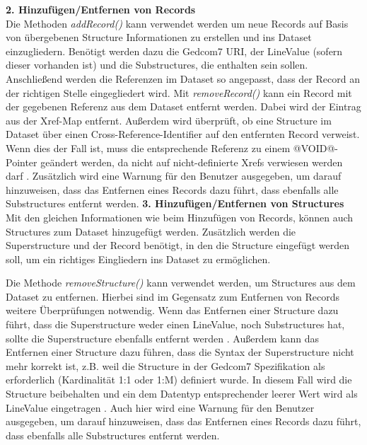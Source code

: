 \vspace{1em}
\textbf{2. Hinzufügen/Entfernen von Records} \vspace{0.5em} \\
Die Methoden \textit{addRecord()} kann verwendet werden um neue Records auf Basis von übergebenen Structure Informationen zu erstellen und ins Dataset einzugliedern. Benötigt werden dazu die Gedcom7 URI, der LineValue (sofern dieser vorhanden ist) und die Substructures, die enthalten sein sollen. Anschließend werden die Referenzen im Dataset so angepasst, dass der Record an der richtigen Stelle eingegliedert wird. Mit \textit{removeRecord()} kann ein Record mit der gegebenen Referenz aus dem Dataset entfernt werden. Dabei wird der Eintrag aus der Xref-Map entfernt. Außerdem wird überprüft, ob eine Structure im Dataset über einen Cross-Reference-Identifier auf den entfernten Record verweist. Wenn dies der Fall ist, muss die entsprechende Referenz zu einem @VOID@-Pointer geändert werden, da nicht auf nicht-definierte Xrefs verwiesen werden darf \cite{GEDCOM}. Zusätzlich wird eine Warnung für den Benutzer ausgegeben, um darauf hinzuweisen, dass das Entfernen eines Records dazu führt, dass ebenfalls alle Substructures entfernt werden. 
\newpage
\textbf{3. Hinzufügen/Entfernen von Structures} \vspace{0.5em} \\
Mit den gleichen Informationen wie beim Hinzufügen von Records, können auch Structures zum Dataset hinzugefügt werden. Zusätzlich werden die Superstructure und der Record benötigt, in den die Structure eingefügt werden soll, um ein richtiges Eingliedern ins Dataset zu ermöglichen. 


Die Methode \textit{removeStructure()} kann verwendet werden, um Structures aus dem Dataset zu entfernen. Hierbei sind im Gegensatz zum Entfernen von Records weitere Überprüfungen notwendig. Wenn das Entfernen einer Structure dazu führt, dass die Superstructure weder einen LineValue, noch Substructures hat, sollte die Superstructure ebenfalls entfernt werden \cite{GEDCOM}. Außerdem kann das Entfernen einer Structure dazu führen, dass die Syntax der Superstructure nicht mehr korrekt ist, z.B. weil die Structure in der Gedcom7 Spezifikation als erforderlich (Kardinalität 1:1 oder 1:M) definiert wurde. In diesem Fall wird die Structure beibehalten und ein dem Datentyp entsprechender leerer Wert wird als LineValue eingetragen \cite{GEDCOM}. Auch hier wird eine Warnung für den Benutzer ausgegeben, um darauf hinzuweisen, dass das Entfernen eines Records dazu führt, dass ebenfalls alle Substructures entfernt werden. 

